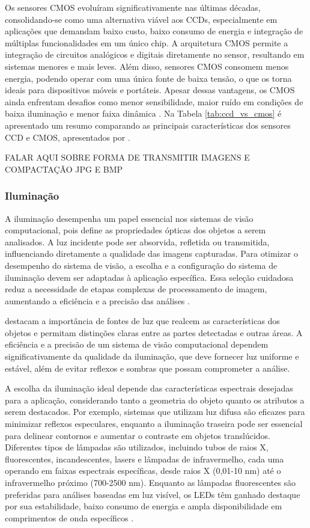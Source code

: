 Os sensores CMOS evoluíram significativamente nas últimas décadas, consolidando-se como uma alternativa viável aos CCDs, especialmente em aplicações que demandam baixo custo, baixo consumo de energia e integração de múltiplas funcionalidades em um único chip. A arquitetura CMOS permite a integração de circuitos analógicos e digitais diretamente no sensor, resultando em sistemas menores e mais leves. Além disso, sensores CMOS consomem menos energia, podendo operar com uma única fonte de baixa tensão, o que os torna ideais para dispositivos móveis e portáteis. Apesar dessas vantagens, os CMOS ainda enfrentam desafios como menor sensibilidade, maior ruído em condições de baixa iluminação e menor faixa dinâmica \cite{bigas2006cmos}. Na Tabela \ref{tab:ccd_vs_cmos} é apresentado um resumo comparando as principais características dos sensores CCD e CMOS, apresentados por .



FALAR AQUI SOBRE FORMA DE TRANSMITIR IMAGENS E COMPACTAÇÃO JPG E BMP

\subsubsection{Iluminação}

A iluminação desempenha um papel essencial nos sistemas de visão computacional, pois define as propriedades ópticas dos objetos a serem analisados. A luz incidente pode ser absorvida, refletida ou transmitida, influenciando diretamente a qualidade das imagens capturadas. Para otimizar o desempenho do sistema de visão, a escolha e a configuração do sistema de iluminação devem ser adaptadas à aplicação específica. Essa seleção cuidadosa reduz a necessidade de etapas complexas de processamento de imagem, aumentando a eficiência e a precisão das análises \cite{chen2002machine_vision}.

 destacam a importância de fontes de luz que realcem as características dos objetos e permitam distinções claras entre as partes detectadas e outras áreas. A eficiência e a precisão de um sistema de visão computacional dependem significativamente da qualidade da iluminação, que deve fornecer luz uniforme e estável, além de evitar reflexos e sombras que possam comprometer a análise. 

A escolha da iluminação ideal depende das características espectrais desejadas para a aplicação, considerando tanto a geometria do objeto quanto os atributos a serem destacados. Por exemplo, sistemas que utilizam luz difusa são eficazes para minimizar reflexos especulares, enquanto a iluminação traseira pode ser essencial para delinear contornos e aumentar o contraste em objetos translúcidos. Diferentes tipos de lâmpadas são utilizados, incluindo tubos de raios X, fluorescentes, incandescentes, lasers e lâmpadas de infravermelho, cada uma operando em faixas espectrais específicas, desde raios X (0,01-10 nm) até o infravermelho próximo (700-2500 nm). Enquanto as lâmpadas fluorescentes são preferidas para análises baseadas em luz visível, os LEDs têm ganhado destaque por sua estabilidade, baixo consumo de energia e ampla disponibilidade em comprimentos de onda específicos \cite{cubero2010advances}.

